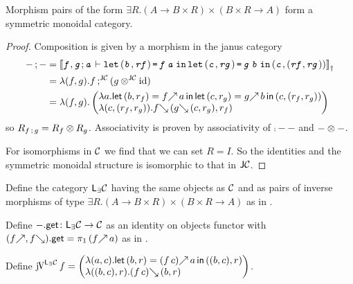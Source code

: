 \documentclass[runningheads,envcountsame]{llncs}
\begin{document}
    \begin{lemma} \label{lem:lensex-is-category}
        Morphism pairs of the form $\exists R. (A \to B \times R) \times (B \times R \to A)$ form a symmetric monoidal category.
    \end{lemma}
    \begin{proof}
        Composition is given by a morphism in the janus category \begin{align*}
            \comp{-}{-} &= \semD{\evar{f}, \evar{g}; \evar{a} \vdash \elet{\epair{\evar{b}}{\evar{rf}}}{\eapp{\evar{f}}{\evar{a}}}{\elet{\epair{\evar{c}}{\evar{rg}}}{\eapp{\evar{g}}{\evar{b}}}{\epair{\evar{c}}{\epair{\evar{rf}}{\evar{rg}}}}}} \\
            &= \lambda (f, g). \comp[\JC]{f}{(\tensor[\JC]{g}{\id})} \\
            &= \lambda (f, g). \janus{
                \lambda a. \nlet{(b, r_f)}{\f{f}\,a}{\nlet{(c, r_g)}{\f{g}\,b}{(c, (r_f, r_g))}}}{
                \lambda (c, (r_f, r_g)). \b{f}\,(\b{g}\,(c, r_g), r_f)}
        \end{align*} so $R_{\comp{f}{g}} = \tensor{R_f}{R_g}$. Associativity is proven by associativity of $\comp{-}{-}$ and $\tensor{-}{-}$.
        
        For isomorphisms in $\mathcal{C}$ we find that we can set $R = I$. So the identities and the symmetric monoidal structure is isomorphic to that in $\mathsf{J}\mathcal{C}$.
    \end{proof}
    
    \begin{definition}
        Define the category ${\mathsf{L}_{\exists}\mathcal{C}}$ having the same objects as $\mathcal{C}$ and as pairs of inverse morphisms of type $\exists R. (A \to B \times R) \times (B \times R \to A)$ as in .
        
        Define ${-}.\mathsf{get}\colon {\mathsf{L}_{\exists}\mathcal{C}} \to \mathcal{C}$ as an identity on objects functor with $\lget{(\f{f}, \b{f})} = \pi_1\,(\f{f}\,a)$  as in .
        
        Define $\juncurry[\LensEx{\C}]\,f = \janus
            {\lambda (a, c). \nlet{(b, r)}{\f{(f\,c)}\,a}{((b, c), r)}}
            {\lambda ((b, c), r). \b{(f\,c)}\,(b, r)}$.
    \end{definition}
    
\end{document}
